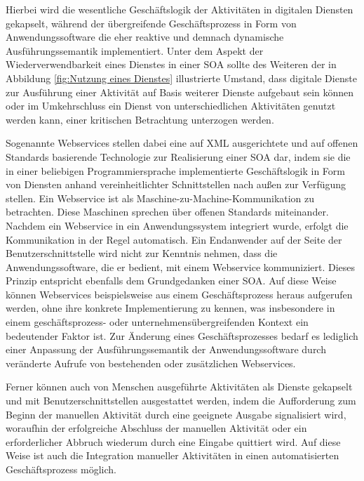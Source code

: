Hierbei wird die wesentliche Geschäftslogik der Aktivitäten in digitalen Diensten gekapselt, während der übergreifende Geschäftsprozess in Form von Anwendungssoftware die eher reaktive und demnach dynamische Ausführungssemantik implementiert. 
\cite{Teusch.2016}
Unter dem Aspekt der Wiederverwendbarkeit eines Dienstes in einer \ac{SOA} sollte des Weiteren der in Abbildung \ref{fig:Nutzung eines Dienstes} illustrierte Umstand, dass digitale Dienste zur Ausführung einer Aktivität auf Basis weiterer Dienste aufgebaut sein können oder im Umkehrschluss ein Dienst von unterschiedlichen Aktivitäten genutzt werden kann, einer kritischen Betrachtung unterzogen werden.
\cite{Masak.2007}

Sogenannte Webservices stellen dabei eine auf \ac{XML} ausgerichtete und auf offenen Standards basierende Technologie zur Realisierung einer \ac{SOA} dar, indem sie die in einer beliebigen Programmiersprache implementierte Geschäftslogik in Form von Diensten anhand vereinheitlichter Schnittstellen nach außen zur Verfügung stellen.
\cite{Masak.2005}
Ein Webservice ist als Maschine-zu-Machine-Kommunikation zu betrachten. Diese Maschinen sprechen über offenen Standards miteinander. 
\cite{Finger.2009b}
Nachdem ein Webservice in ein Anwendungssystem integriert wurde, erfolgt die Kommunikation in der Regel automatisch. 
Ein Endanwender auf der Seite der Benutzerschnittstelle wird nicht zur Kenntnis nehmen, dass die Anwendungssoftware, die er bedient, mit einem Webservice kommuniziert. Dieses Prinzip entspricht ebenfalls dem Grundgedanken einer \ac{SOA}.
\cite{Teusch.2016}
Auf diese Weise können Webservices beispielsweise aus einem Geschäftsprozess heraus aufgerufen werden, ohne ihre konkrete Implementierung zu kennen, was insbesondere in einem geschäftsprozess- oder unternehmensübergreifenden Kontext ein bedeutender Faktor ist. Zur Änderung eines Geschäftsprozesses bedarf es lediglich einer Anpassung der Ausführungssemantik der Anwendungssoftware durch veränderte Aufrufe von bestehenden oder zusätzlichen Webservices. 

Ferner können auch von Menschen ausgeführte Aktivitäten als Dienste gekapselt und mit Benutzerschnittstellen ausgestattet werden, indem die Aufforderung zum Beginn der manuellen Aktivität durch eine geeignete Ausgabe signalisiert wird, woraufhin der erfolgreiche Abschluss der manuellen Aktivität oder ein erforderlicher Abbruch wiederum durch eine Eingabe quittiert wird. 
Auf diese Weise ist auch die Integration manueller Aktivitäten in einen automatisierten Geschäftsprozess möglich.
\cite{Weske.2007}

